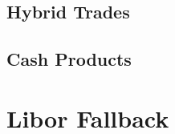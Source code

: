 \documentclass[12pt, a4paper]{article}
\begin{document}
\subsection{Hybrid Trades}



\subsection{Cash Products}












\section{Libor Fallback}




\newpage

\end{document}
